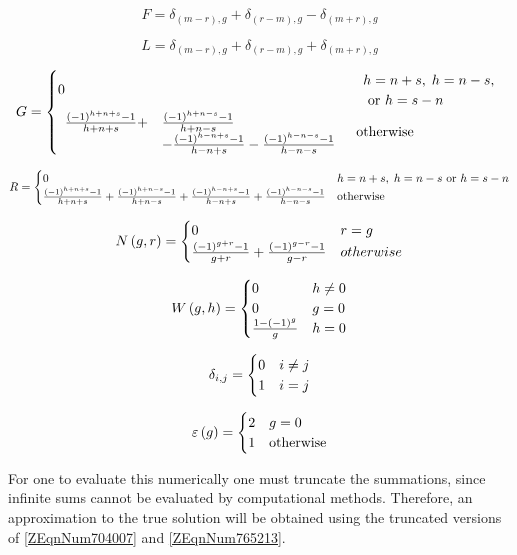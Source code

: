 \begin{equation*}
    F = \delta _{\left(m - r\right), g} + \delta _{\left(r - m\right), g} - 
    \delta _{\left(m + r\right), g}
\end{equation*}

\begin{equation*}
    L=\delta _{\left(m - r\right), g} +\delta _{\left(r - m\right), g} + \delta
    _{\left(m + r\right), g} 
\end{equation*}

\begin{equation} \label{ZEqnNum668374} 
    G = \begin{cases} 0 & \begin{array}{l} 
        h = n + s , \; h = n - s, \\ 
        \text{ or } h = s - n
    \end{array} \\ \begin{array}{ll} 
        \frac{\left(-1\right)^{h + n + s} - 1}{h + n + s}  
       + & \frac{\left(-1\right)^{h + n - s} - 1}{h + n - s} \\
       & - \frac{\left(-1\right)^{h - n + s} - 1}{h - n + s} 
        - \frac{\left(-1\right)^{h - n - s} - 1}{h - n - s}
    \end{array} & \text{otherwise} \end{cases} 
\end{equation}

\begin{equation*}
    R = \begin{cases} 0 & h = n + s , \; h = n - s \text{ or } h = s - n \\ \frac{\left(-1\right)^{h + n + s} - 1}{h + n + s} +
    \frac{\left(-1\right)^{h + n - s} - 1}{h + n - s} + 
    \frac{\left(-1\right)^{h - n + s} - 1}{h - n + s} + 
    \frac{\left(-1\right)^{h - n - s} - 1}{h - n - s} &  \text{otherwise} \end{cases}  
\end{equation*}

\begin{equation*}
    N\left(g,r\right) = \begin{cases} 0 & r = g \\ \frac{\left(-1\right)^{g + r} - 1}{g + r} + 
    \frac{\left(-1\right)^{g - r} - 1}{g - r} & otherwise \end{cases} 
\end{equation*}

\begin{equation*}
    W\left(g,h\right) = \begin{cases} 0 & h \ne 0 \\ 0 & g=0 \\ \frac{1 - \left(-1\right)^{g} }{g}  & h = 0 \end{cases}
\end{equation*}

\begin{equation*}
    \delta _{i,j}  = \begin{cases} 0 & i \ne j \\ 1 & i = j \end{cases}
\end{equation*}

\begin{equation*}
    \varepsilon \left(g\right) = \begin{cases} 2 & g = 0 \\ 1 &  \text{otherwise} \end{cases}
\end{equation*}

For one to evaluate this numerically one must truncate the summations, since infinite sums cannot be
evaluated by computational methods. Therefore, an approximation to the true solution will be
obtained using the truncated versions of \eqref{ZEqnNum704007} and \eqref{ZEqnNum765213}.
